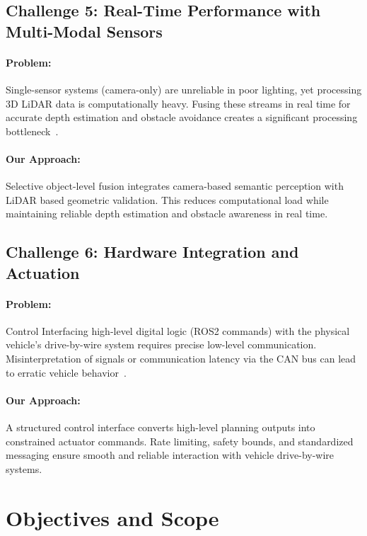 \documentclass[12pt, a4paper]{report}
\begin{document}
\subsection{Challenge 5: Real-Time Performance with Multi-Modal Sensors}

\paragraph{Problem:}
Single-sensor systems (camera-only) are unreliable in poor lighting, yet processing 3D \ac{LiDAR} data is computationally heavy. Fusing these streams in real time for accurate depth estimation and obstacle avoidance creates a significant processing bottleneck~\cite{ref4}.

\paragraph{Our Approach:}
Selective object-level fusion integrates camera-based semantic perception with \ac{LiDAR} based geometric validation. This reduces computational load while maintaining reliable depth estimation and obstacle awareness in real time.

\subsection{Challenge 6: Hardware Integration and Actuation}

\paragraph{Problem:}
Control Interfacing high-level digital logic (\ac{ROS}2 commands) with the physical vehicle's drive-by-wire system requires precise low-level communication. Misinterpretation of signals or communication latency via the \ac{CAN} bus can lead to erratic vehicle behavior~\cite{ref5}.

\paragraph{Our Approach:}
A structured control interface converts high-level planning outputs into constrained actuator commands. Rate limiting, safety bounds, and standardized messaging ensure smooth and reliable interaction with vehicle drive-by-wire systems.


\section{Objectives and Scope}
\end{document}
